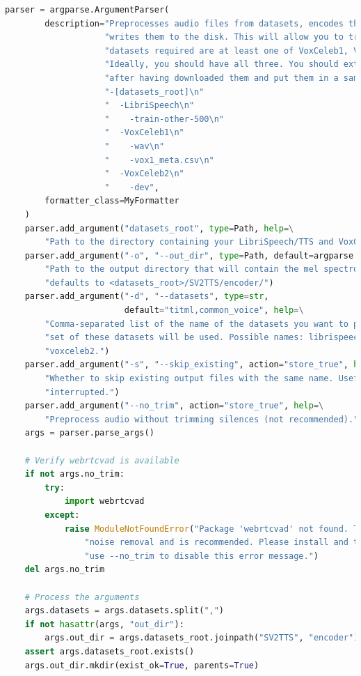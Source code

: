 \begin{enumerate}
\begin{lstlisting}[language=Python, caption=Preprocessing Encoder Model, label=lstencoder]
    parser = argparse.ArgumentParser(
        description="Preprocesses audio files from datasets, encodes them as mel spectrograms and "
                    "writes them to the disk. This will allow you to train the encoder. The "
                    "datasets required are at least one of VoxCeleb1, VoxCeleb2 and LibriSpeech. "
                    "Ideally, you should have all three. You should extract them as they are "
                    "after having downloaded them and put them in a same directory, e.g.:\n"
                    "-[datasets_root]\n"
                    "  -LibriSpeech\n"
                    "    -train-other-500\n"
                    "  -VoxCeleb1\n"
                    "    -wav\n"
                    "    -vox1_meta.csv\n"
                    "  -VoxCeleb2\n"
                    "    -dev",
        formatter_class=MyFormatter
    )
    parser.add_argument("datasets_root", type=Path, help=\
        "Path to the directory containing your LibriSpeech/TTS and VoxCeleb datasets.")
    parser.add_argument("-o", "--out_dir", type=Path, default=argparse.SUPPRESS, help=\
        "Path to the output directory that will contain the mel spectrograms. If left out, "
        "defaults to <datasets_root>/SV2TTS/encoder/")
    parser.add_argument("-d", "--datasets", type=str,
                        default="titml,common_voice", help=\
        "Comma-separated list of the name of the datasets you want to preprocess. Only the train "
        "set of these datasets will be used. Possible names: librispeech_other, voxceleb1, "
        "voxceleb2.")
    parser.add_argument("-s", "--skip_existing", action="store_true", help=\
        "Whether to skip existing output files with the same name. Useful if this script was "
        "interrupted.")
    parser.add_argument("--no_trim", action="store_true", help=\
        "Preprocess audio without trimming silences (not recommended).")
    args = parser.parse_args()

    # Verify webrtcvad is available
    if not args.no_trim:
        try:
            import webrtcvad
        except:
            raise ModuleNotFoundError("Package 'webrtcvad' not found. This package enables "
                "noise removal and is recommended. Please install and try again. If installation fails, "
                "use --no_trim to disable this error message.")
    del args.no_trim

    # Process the arguments
    args.datasets = args.datasets.split(",")
    if not hasattr(args, "out_dir"):
        args.out_dir = args.datasets_root.joinpath("SV2TTS", "encoder")
    assert args.datasets_root.exists()
    args.out_dir.mkdir(exist_ok=True, parents=True)


\end{lstlisting}
\end{enumerate}
